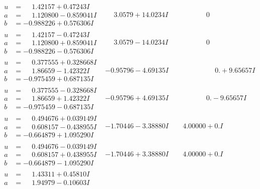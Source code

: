 \documentclass[1p]{elsarticle_modified}
\theoremstyle{definition}
\begin{document}
$$\begin{array}{c|c|c}
\begin{aligned}
u &= \phantom{-}1.42157 + 0.47243 I \\
a &= \phantom{-}1.120800 - 0.859041 I \\
b &= -0.988226 + 0.576306 I\end{aligned}
 & \phantom{-}3.0579 + 14.0234 I & \phantom{-0.000000 } 0 \\ \hline\begin{aligned}
u &= \phantom{-}1.42157 - 0.47243 I \\
a &= \phantom{-}1.120800 + 0.859041 I \\
b &= -0.988226 - 0.576306 I\end{aligned}
 & \phantom{-}3.0579 - 14.0234 I & \phantom{-0.000000 } 0 \\ \hline\begin{aligned}
u &= \phantom{-}0.377555 + 0.328668 I \\
a &= \phantom{-}1.86659 - 1.42322 I \\
b &= -0.975459 + 0.687135 I\end{aligned}
 & -0.95796 - 4.69135 I & \phantom{-0.000000 -}0. + 9.65657 I \\ \hline\begin{aligned}
u &= \phantom{-}0.377555 - 0.328668 I \\
a &= \phantom{-}1.86659 + 1.42322 I \\
b &= -0.975459 - 0.687135 I\end{aligned}
 & -0.95796 + 4.69135 I & \phantom{-0.000000 } 0. - 9.65657 I \\ \hline\begin{aligned}
u &= \phantom{-}0.494676 + 0.039149 I \\
a &= \phantom{-}0.608157 - 0.438955 I \\
b &= -0.664879 + 1.095290 I\end{aligned}
 & -1.70446 - 3.38880 I & \phantom{-}4.00000 + 0. I\phantom{ +0.000000I} \\ \hline\begin{aligned}
u &= \phantom{-}0.494676 - 0.039149 I \\
a &= \phantom{-}0.608157 + 0.438955 I \\
b &= -0.664879 - 1.095290 I\end{aligned}
 & -1.70446 + 3.38880 I & \phantom{-}4.00000 + 0. I\phantom{ +0.000000I} \\ \hline\begin{aligned}
u &= \phantom{-}1.43311 + 0.45810 I \\
a &= \phantom{-}1.94979 - 0.10603 I \\

\end{aligned}
\end{array}$$
\end{document}
